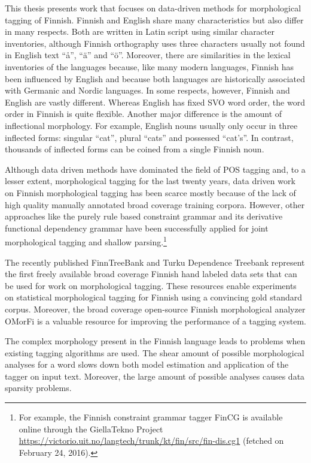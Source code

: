 This thesis presents work that focuses on data-driven methods for
morphological tagging of Finnish. Finnish and English share many
characteristics but also differ in many respects. Both are written in
Latin script using similar character inventories, although Finnish
orthography uses three characters usually not found in English text
``å'', ``ä'' and ``ö''. Moreover, there are similarities in the
lexical inventories of the languages because, like many modern
languages, Finnish has been influenced by English and because both
languages are historically associated with Germanic and Nordic
languages. In some respects, however, Finnish and English are vastly
different. Whereas English has fixed SVO word order, the word order in
Finnish is quite flexible. Another major difference is the amount of
inflectional morphology. For example, English nouns usually only occur
in three inflected forms: singular ``cat'', plural ``cats'' and
possessed ``cat's''. In contrast, thousands of inflected forms can be
coined from a single Finnish noun.

Although data driven methods have dominated the field of POS tagging
and, to a lesser extent, morphological tagging for the last twenty
years, data driven work on Finnish morphological tagging has been
scarce mostly because of the lack of high quality manually annotated
broad coverage training corpora. However, other approaches like the
purely rule based constraint grammar \citep{Karlsson1995} and its
derivative functional dependency grammar \citep{Tapanainen1997} have
been successfully applied for joint morphological tagging and
shallow parsing.\footnote{For example, the Finnish constraint grammar
  tagger FinCG is available online through the GiellaTekno Project
  \url{https://victorio.uit.no/langtech/trunk/kt/fin/src/fin-dis.cg1}
  (fetched on February 24, 2016).}

The recently published FinnTreeBank \citep{Voutilainen2011} and Turku
Dependence Treebank \citep{Haverinen2013} represent the first freely
available broad coverage Finnish hand labeled data sets that can be
used for work on morphological tagging. These resources enable
experiments on statistical morphological tagging for Finnish using a
convincing gold standard corpus. Moreover, the broad coverage
open-source Finnish morphological analyzer OMorFi \citep{Pirinen2011}
is a valuable resource for improving the performance of a tagging
system.

The complex morphology present in the Finnish language leads to problems
when existing tagging algorithms are used. The shear amount of
possible morphological analyses for a word slows down both model
estimation and application of the tagger on input text. Moreover, the
large amount of possible analyses causes data sparsity
problems. %

